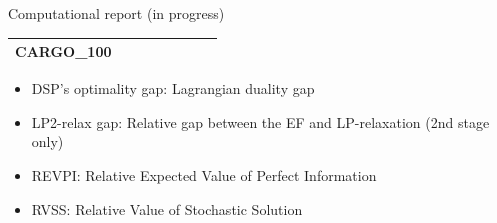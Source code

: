 \documentclass{beamer}
\def\eight{\fontsize{8pt}{8pt}\selectfont}
\begin{document}
\begin{frame}{Computational report (in progress)}
\begin{table}[H]
{\begin{tabular}{|l|ll|ll|l|l|l|}
					CARGO\_100                     &                                 &                                &                                  &                                 &                                    &                            &                            \\ \hline	
				\end{tabular}%
				}
		\end{table}
		\begin{itemize}
			\item DSP's optimality gap: Lagrangian duality gap
			\item LP2-relax gap: Relative gap between the EF and LP-relaxation (2nd stage only)
			\item REVPI: Relative Expected Value of Perfect Information
			\item RVSS: Relative Value of Stochastic Solution
		\end{itemize}
	\end{frame}
%
%	
\end{document}
